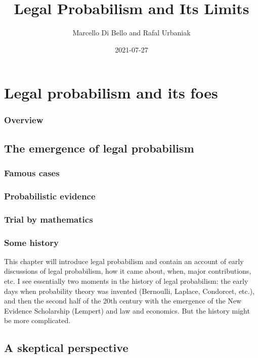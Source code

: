 \documentclass[]{book}
\title{Legal Probabilism and Its Limits}
\author{Marcello Di Bello and Rafal Urbaniak}
\date{2021-07-27}
\begin{document}
\maketitle

{
\setcounter{tocdepth}{1}
\tableofcontents
}
\part{Legal probabilism and its foes}

\section*{Overview}

\chapter{The emergence of legal probabilism}

\section{Famous cases}

\section{Probabilistic evidence}

\section{Trial by mathematics}

\section{Some history}

This chapter will introduce legal probabilism and contain an account of
early\\
discussions of legal probabilism, how it came about, when, major
contributions, etc. I see essentially two moments in the history of
legal probabilism: the early days when probability theory was invented
(Bernoulli, Laplace, Condorcet, etc.), and then the second half of the
20th century with the emergence of the New Evidence Scholarship
(Lempert) and law and economics. But the history might be more
complicated.

\chapter{A skeptical perspective}
\end{document}
